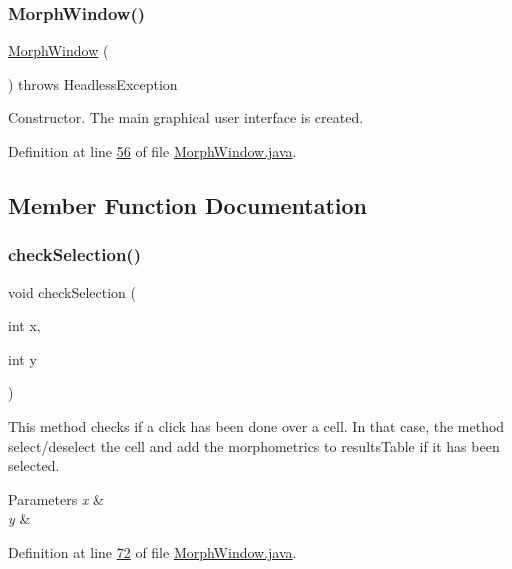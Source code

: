 \subsubsection{\texorpdfstring{Morph\+Window()}{MorphWindow()}}
{\footnotesize\ttfamily \hyperlink{classgui_1_1_morph_window}{Morph\+Window} (\begin{DoxyParamCaption}{ }\end{DoxyParamCaption}) throws Headless\+Exception}

Constructor. The main graphical user interface is created. 

Definition at line \hyperlink{_morph_window_8java_source_l00056}{56} of file \hyperlink{_morph_window_8java_source}{Morph\+Window.\+java}.



\subsection{Member Function Documentation}
\hypertarget{classgui_1_1_morph_window_a7ea2b90728ffa99304e7d2585376a374}{}\label{classgui_1_1_morph_window_a7ea2b90728ffa99304e7d2585376a374} 
\subsubsection{\texorpdfstring{check\+Selection()}{checkSelection()}}
{\footnotesize\ttfamily void check\+Selection (\begin{DoxyParamCaption}\item[{int}]{x,  }\item[{int}]{y }\end{DoxyParamCaption})}

This method checks if a click has been done over a cell. In that case, the method select/deselect the cell and add the morphometrics to results\+Table if it has been selected.


\begin{DoxyParams}{Parameters}
{\em x} & \\
\hline
{\em y} & \\
\hline
\end{DoxyParams}


Definition at line \hyperlink{_morph_window_8java_source_l00072}{72} of file \hyperlink{_morph_window_8java_source}{Morph\+Window.\+java}.

